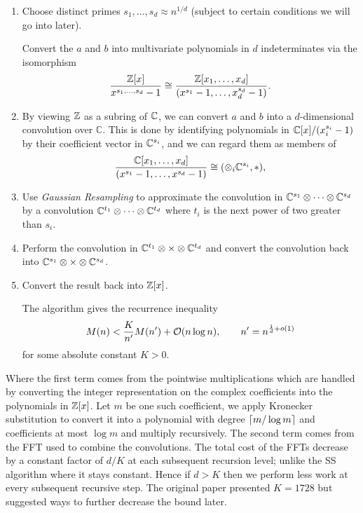 \begin{enumerate}
    \item  Choose distinct primes $s_1, \ldots, s_d \approx n^{1/d}$ (subject to certain conditions we will go into later). 

    Convert the $a$ and $b$ into multivariate polynomials in $d$ indeterminates via the isomorphism
        \[
            \frac{{\mathbb Z}[x]}{x^{s_1, \ldots, s_d} - 1} \cong \frac{{\mathbb Z}[x_1, \ldots, x_d]}{(x^{s_1} - 1, \ldots, x_d^{s_d} - 1)}.
        \]
    \item By viewing ${\mathbb Z}$ as a subring of ${\mathbb C}$, we can convert $a$ and $b$ into a $d$-dimensional convolution over $\mathbb{C}$.
        This is done by identifying polynomials in ${\mathbb C}[x]/(x_i^{s_i} - 1)$ by their coefficient vector in ${\mathbb C}^{s_i}$, and we can regard them as members of
        \[
            \frac{{\mathbb C}[x_1, \ldots, x_d]}{(x^{s_1} - 1, \ldots, x^{s_d} - 1)} \cong (\otimes_i {\mathbb C}^{s_i}, \ast),
        \]
    \item Use \emph{Gaussian Resampling} to approximate the convolution in ${\mathbb C}^{s_1} \otimes \cdots \otimes {\mathbb C}^{s_d}$ by a convolution ${\mathbb C}^{t_1} \otimes \cdots \otimes {\mathbb C}^{t_d}$ where $t_i$ is the next power of two greater than $s_i$.
    \item Perform the convolution in ${\mathbb C}^{t_1} \otimes \times \otimes {\mathbb C}^{t_d}$ and convert the convolution back into ${\mathbb C}^{s_1} \otimes \times \otimes {\mathbb C}^{s_d}$.
    \item Convert the result back into ${\mathbb Z}[x]$.

        The algorithm gives the recurrence inequality
        \[
            M(n) < \frac{K}{n^\prime}M(n^\prime) + \mathcal O(n \log n), \qquad n^\prime = n^{\frac{1}{d} + o(1)}
        \]
        for some absolute constant $K > 0$.
\end{enumerate}

Where the first term comes from the pointwise multiplications which are handled by converting the integer representation on the complex coefficients into the polynomials in ${\mathbb Z}[x]$. Let $m$ be one such coefficient, we apply Kronecker substitution to convert it into a polynomial with degree $\left \lceil m / \log m \right \rceil$ and coefficients at most $\log m$ and multiply recursively. The second term comes from the FFT used to combine the convolutions. The total cost of the FFTs decrease by a constant factor of $d/K$ at each subsequent recursion level; unlike the SS algorithm where it stays constant. Hence if $d > K$ then we perform less work at every subsequent recursive step. The original paper presented $K = 1728$ but suggested ways to further decrease the bound later.

